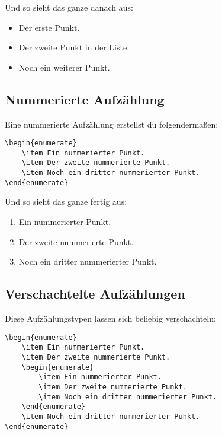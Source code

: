Und so sieht das ganze danach aus:

\begin{itemize}
	\item Der erste Punkt.
	\item Der zweite Punkt in der Liste.
	\item Noch ein weiterer Punkt.
\end{itemize}

\subsection{Nummerierte Aufzählung}

Eine nummerierte Aufzählung erstellst du folgendermaßen:
\begin{lstlisting}
\begin{enumerate}
	\item Ein nummerierter Punkt.
	\item Der zweite nummerierte Punkt.
	\item Noch ein dritter nummerierter Punkt.
\end{enumerate}
\end{lstlisting}

Und so sieht das ganze fertig aus:

\begin{enumerate}
	\item Ein nummerierter Punkt.
	\item Der zweite nummerierte Punkt.
	\item Noch ein dritter nummerierter Punkt.
\end{enumerate}

\subsection{Verschachtelte Aufzählungen}

Diese Aufzählungstypen lassen sich beliebig verschachteln:
\begin{lstlisting}
\begin{enumerate}
	\item Ein nummerierter Punkt.
	\item Der zweite nummerierte Punkt.
	\begin{enumerate}
		\item Ein nummerierter Punkt.
		\item Der zweite nummerierte Punkt.
		\item Noch ein dritter nummerierter Punkt.
	\end{enumerate}
	\item Noch ein dritter nummerierter Punkt.
\end{enumerate}
\end{lstlisting}

